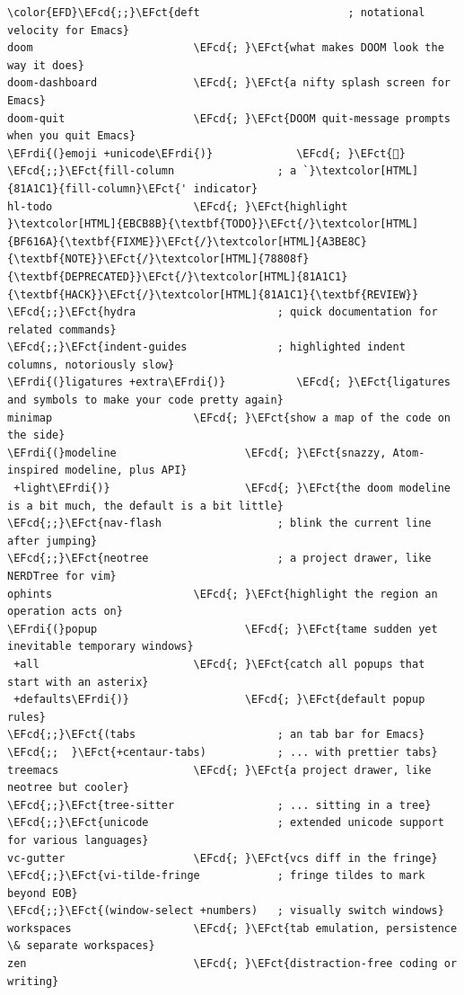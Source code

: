\documentclass{scrartcl}
\newcommand{\EFct}[1]{\textcolor{EFct}{#1}} %
\newcommand{\EFcd}[1]{\textcolor{EFcd}{#1}} %
\newcommand{\EFrdi}[1]{#1} %
\begin{document}
\begin{enumerate}
\begin{Code}
\begin{Verbatim}[]
\color{EFD}\EFcd{;;}\EFct{deft                       ; notational velocity for Emacs}
doom                         \EFcd{; }\EFct{what makes DOOM look the way it does}
doom-dashboard               \EFcd{; }\EFct{a nifty splash screen for Emacs}
doom-quit                    \EFcd{; }\EFct{DOOM quit-message prompts when you quit Emacs}
\EFrdi{(}emoji +unicode\EFrdi{)}             \EFcd{; }\EFct{🙂}
\EFcd{;;}\EFct{fill-column                ; a `}\textcolor[HTML]{81A1C1}{fill-column}\EFct{' indicator}
hl-todo                      \EFcd{; }\EFct{highlight }\textcolor[HTML]{EBCB8B}{\textbf{TODO}}\EFct{/}\textcolor[HTML]{BF616A}{\textbf{FIXME}}\EFct{/}\textcolor[HTML]{A3BE8C}{\textbf{NOTE}}\EFct{/}\textcolor[HTML]{78808f}{\textbf{DEPRECATED}}\EFct{/}\textcolor[HTML]{81A1C1}{\textbf{HACK}}\EFct{/}\textcolor[HTML]{81A1C1}{\textbf{REVIEW}}
\EFcd{;;}\EFct{hydra                      ; quick documentation for related commands}
\EFcd{;;}\EFct{indent-guides              ; highlighted indent columns, notoriously slow}
\EFrdi{(}ligatures +extra\EFrdi{)}           \EFcd{; }\EFct{ligatures and symbols to make your code pretty again}
minimap                      \EFcd{; }\EFct{show a map of the code on the side}
\EFrdi{(}modeline                    \EFcd{; }\EFct{snazzy, Atom-inspired modeline, plus API}
 +light\EFrdi{)}                     \EFcd{; }\EFct{the doom modeline is a bit much, the default is a bit little}
\EFcd{;;}\EFct{nav-flash                  ; blink the current line after jumping}
\EFcd{;;}\EFct{neotree                    ; a project drawer, like NERDTree for vim}
ophints                      \EFcd{; }\EFct{highlight the region an operation acts on}
\EFrdi{(}popup                       \EFcd{; }\EFct{tame sudden yet inevitable temporary windows}
 +all                        \EFcd{; }\EFct{catch all popups that start with an asterix}
 +defaults\EFrdi{)}                  \EFcd{; }\EFct{default popup rules}
\EFcd{;;}\EFct{(tabs                      ; an tab bar for Emacs}
\EFcd{;;  }\EFct{+centaur-tabs)           ; ... with prettier tabs}
treemacs                     \EFcd{; }\EFct{a project drawer, like neotree but cooler}
\EFcd{;;}\EFct{tree-sitter                ; ... sitting in a tree}
\EFcd{;;}\EFct{unicode                    ; extended unicode support for various languages}
vc-gutter                    \EFcd{; }\EFct{vcs diff in the fringe}
\EFcd{;;}\EFct{vi-tilde-fringe            ; fringe tildes to mark beyond EOB}
\EFcd{;;}\EFct{(window-select +numbers)   ; visually switch windows}
workspaces                   \EFcd{; }\EFct{tab emulation, persistence \& separate workspaces}
zen                          \EFcd{; }\EFct{distraction-free coding or writing}
\end{Verbatim}
\end{Code}


\end{enumerate}
\end{document}
